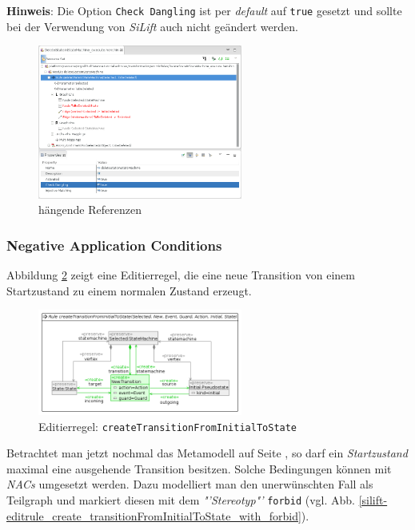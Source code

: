 \textbf{Hinweis}: Die Option \texttt{Check Dangling} ist per \textit{default} auf \texttt{true} gesetzt und sollte bei der Verwendung von \textit{SiLift} auch nicht geändert werden.


\begin{figure}[H]
\centering
\includegraphics[width=0.6\textwidth]{editrules/graphics/silift-editrule_delete_stateInStateMachine_checkDangling.png}
\caption{hängende Referenzen}
\label{silift-silift-editrule_delete_stateInStateMachine_checkDangling}
\end{figure}


\subsubsection*{Negative Application Conditions}

Abbildung \ref{silift-editrule_create_transitionFromInitialToState} zeigt eine Editierregel, die eine neue Transition von einem Startzustand zu einem normalen Zustand erzeugt.

\begin{figure}[H]
\centering
\includegraphics[width=0.6\textwidth]{editrules/graphics/silift-editrule_create_transitionFromInitialToState.png}
\caption{Editierregel: \texttt{createTransitionFromInitialToState}}
\label{silift-editrule_create_transitionFromInitialToState}
\end{figure}

Betrachtet man jetzt nochmal das Metamodell  auf Seite \pageref{subsec:metamodel}, so darf ein \textit{Startzustand} maxi\-mal eine ausgehende Transition besitzen.
Solche Bedingungen können mit \textit{NACs} umgesetzt werden.
Dazu modelliert man den unerwünschten Fall als Teilgraph und markiert diesen mit dem \textit{"'Stereotyp"'} \texttt{forbid} (vgl. Abb. \ref{silift-editrule_create_transitionFromInitialToState_with_forbid}).

